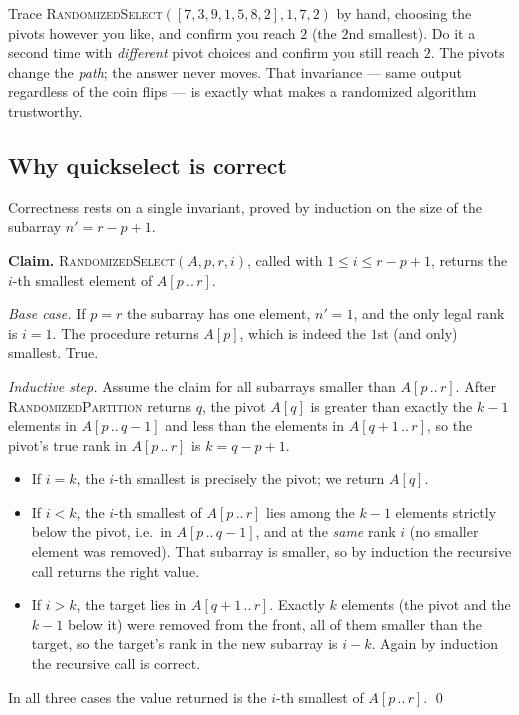 \begin{labbox}
Trace \textsc{RandomizedSelect}$([7,3,9,1,5,8,2], 1, 7, 2)$ by hand, choosing the
pivots however you like, and confirm you reach $2$ (the $2$nd smallest). Do it a
second time with \emph{different} pivot choices and confirm you still reach $2$.
The pivots change the \emph{path}; the answer never moves. That invariance --- same
output regardless of the coin flips --- is exactly what makes a randomized
algorithm trustworthy.
\end{labbox}

\subsection{Why quickselect is correct}

Correctness rests on a single invariant, proved by induction on the size of the
subarray $n' = r - p + 1$.

\begin{formalbox}
\textbf{Claim.} \textsc{RandomizedSelect}$(A, p, r, i)$, called with
$1 \le i \le r - p + 1$, returns the $i$-th smallest element of $A[p\,..\,r]$.

\emph{Base case.} If $p = r$ the subarray has one element, $n' = 1$, and the only
legal rank is $i = 1$. The procedure returns $A[p]$, which is indeed the $1$st (and
only) smallest. True.

\emph{Inductive step.} Assume the claim for all subarrays smaller than $A[p\,..\,r]$.
After \textsc{RandomizedPartition} returns $q$, the pivot $A[q]$ is greater than
exactly the $k-1$ elements in $A[p\,..\,q-1]$ and less than the elements in
$A[q+1\,..\,r]$, so the pivot's true rank in $A[p\,..\,r]$ is $k = q-p+1$.
\begin{itemize}
  \item If $i = k$, the $i$-th smallest is precisely the pivot; we return $A[q]$.
  \item If $i < k$, the $i$-th smallest of $A[p\,..\,r]$ lies among the $k-1$
    elements strictly below the pivot, i.e.\ in $A[p\,..\,q-1]$, and at the
    \emph{same} rank $i$ (no smaller element was removed). That subarray is
    smaller, so by induction the recursive call returns the right value.
  \item If $i > k$, the target lies in $A[q+1\,..\,r]$. Exactly $k$ elements (the
    pivot and the $k-1$ below it) were removed from the front, all of them smaller
    than the target, so the target's rank in the new subarray is $i - k$. Again by
    induction the recursive call is correct.
\end{itemize}
In all three cases the value returned is the $i$-th smallest of $A[p\,..\,r]$.
\qed
\end{formalbox}


